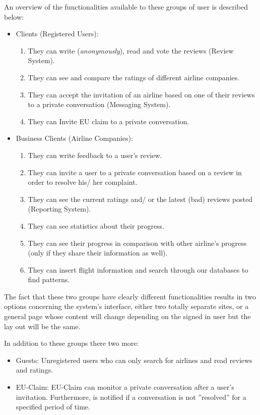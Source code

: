 \documentclass{article}
\begin{document}
An overview of the functionalities available to these groups of user is described below: 
\begin{itemize}
\item Clients (Registered Users):
	\begin{enumerate}
		\item They can write ({\em anonymously}), read and vote the reviews (Review System).
        \item They can see and compare the ratings of different airline companies.
        \item They can accept the invitation of an airline based on one of their reviews to a private conversation (Messaging System). 
		\item They can Invite EU claim to a private conversation.
	\end{enumerate}
\item Business Clients (Airline Companies):
	\begin{enumerate}
		\item They can write feedback to a user's review.
		\item They can invite a user to a private conversation based on a review in order to resolve his/ her complaint.
		\item They can see the current ratings and/ or the latest (bad) reviews posted (Reporting System).
		\item They can see statistics about their progress.
		\item They can see their progress in comparison with other airline's progress (only if they share their information as well).
		\item They can insert flight information and search through our databases to find patterns.
	\end{enumerate}
\end{itemize}

The fact that these two groups have clearly different functionalities results in two options concerning the system's interface, either two totally separate sites, or a general page 
whose content will change depending on the signed in user but the lay out will be the same.

In addition to these groups there two more:
\begin{itemize}
 \item Guests: Unregistered users who can only search for airlines and read reviews and ratings.
 \item EU-Claim: EU-Claim can monitor a private conversation after a user's invitation. Furthermore, is notified if a conversation is not ''resolved'' for a specified period of time.
\end{itemize}
\end{document}
